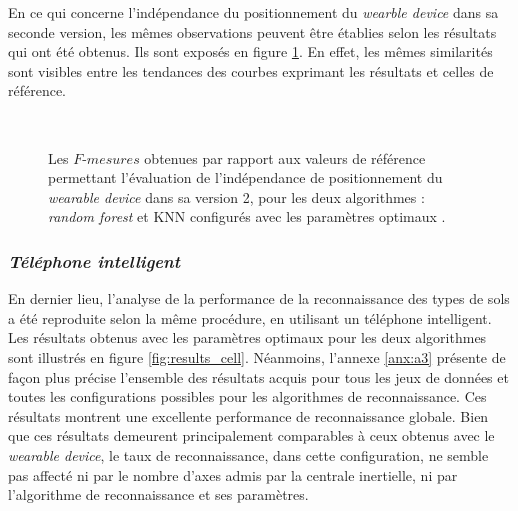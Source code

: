 En ce qui concerne l'indépendance du positionnement du \textit{wearble device} dans sa seconde version, les mêmes observations peuvent être établies selon les résultats qui ont été obtenus. Ils sont exposés en figure \ref{fig:pos_ind_wear_v2}. En effet, les mêmes similarités sont visibles entre les tendances des courbes exprimant les résultats et celles de référence.

\begin{figure}[H]
    \centering
    \\[20pt]
    \caption[Les $F\mbox{-} mesures$ obtenues par rapport aux valeurs de référence permettant l'évaluation de l'indépendance de positionnement du \textit{wearable device} dans sa version 2, pour les deux algorithmes : \textit{random forest} et \acs{KNN} configurés avec les paramètres optimaux.]{Les $F\mbox{-} mesures$ obtenues par rapport aux valeurs de référence permettant l'évaluation de l'indépendance de positionnement du \textit{wearable device} dans sa version 2, pour les deux algorithmes : \textit{random forest} et \acs{KNN} configurés avec les paramètres optimaux \citep{Thullier2017}.}
    \label{fig:pos_ind_wear_v2}
\end{figure}

\subsubsection{\textit{Téléphone intelligent}}

En dernier lieu, l'analyse de la performance de la reconnaissance des types de sols a été reproduite selon la même procédure, en utilisant un téléphone intelligent. Les résultats obtenus avec les paramètres optimaux pour les deux algorithmes sont illustrés en figure \ref{fig:results_cell}. Néanmoins, l'annexe \ref{anx:a3} présente de façon plus précise l'ensemble des résultats acquis pour tous les jeux de données et toutes les configurations possibles pour les algorithmes de reconnaissance. Ces résultats montrent une excellente performance de reconnaissance globale. Bien que ces résultats demeurent principalement comparables à ceux obtenus avec le \textit{wearable device}, le taux de reconnaissance, dans cette configuration, ne semble pas affecté ni par le nombre d'axes admis par la centrale inertielle, ni par l'algorithme de reconnaissance et ses paramètres.

